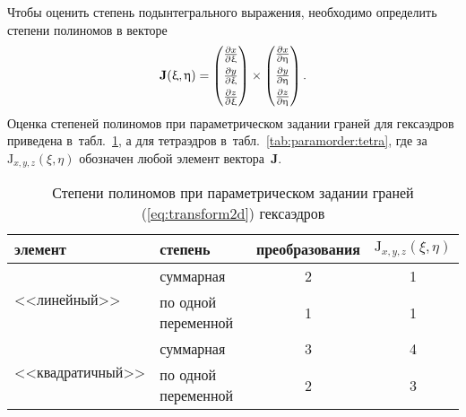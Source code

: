 Чтобы оценить степень подынтегрального выражения, необходимо определить степени полиномов в векторе
\begin{equation}\label{eq:normal}
\mathbf J(\upxi, \upeta) =
\begin{pmatrix}
\frac{\partial x}{\partial \upxi} \\[1ex]
\frac{\partial y}{\partial \upxi} \\[1ex]
\frac{\partial z}{\partial \upxi} \\
\end{pmatrix}
\times
\begin{pmatrix}
\frac{\partial x}{\partial \upeta} \\[1ex]
\frac{\partial y}{\partial \upeta} \\[1ex]
\frac{\partial z}{\partial \upeta} \\
\end{pmatrix}.
\end{equation}
Оценка степеней полиномов при параметрическом задании граней для гексаэдров приведена в~табл.~\ref{tab:paramorder:hexa}, а для тетраэдров в~табл.~\ref{tab:paramorder:tetra}, где за~\(\mathrm J_{x,y,z}(\xi, \eta)\) обозначен любой элемент вектора~\(\mathbf J\).

\begin{table}[h]
	\centering
	\caption{Степени полиномов при параметрическом задании граней (\ref{eq:transform2d}) гексаэдров}
	\label{tab:paramorder:hexa}
	\smallskip
	\begin{tabular}{l l c c}
		\toprule
		элемент                           & степень             & преобразования & \(\mathrm J_{x,y,z}(\xi, \eta)\) \\
		\midrule
		\multirow{2}{*}{<<линейный>>}     & суммарная           & 2              & 1 \\
		                                  & по одной переменной & 1              & 1 \\
		\midrule
		\multirow{2}{*}{<<квадратичный>>} & суммарная           & 3              & 4 \\
		                                  & по одной переменной & 2              & 3 \\
		\bottomrule
	\end{tabular}
\end{table}

